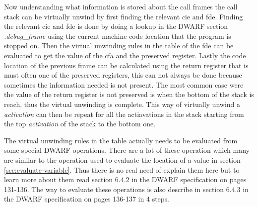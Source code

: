 Now understanding what information is stored about the call frames the call stack can be virtually unwind by first finding the relevant \gls{cie} and \gls{fde}.
Finding the relevant \gls{cie} and \gls{fde} is done by doing a lookup in the \gls{DWARF} section \emph{.debug\_frame} using the current machine code location that the program is stopped on.
Then the virtual unwinding rules in the table of the \gls{fde} can be evaluated to get the value of the \gls{cfa} and the preserved register.
Lastly the code location of the previous frame can be calculated using the return register that is must often one of the preserved registers, this can not always be done because sometimes the information needed is not present.
The most common case were the value of the return register is not preserved is when the bottom of the stack is reach, thus the virtual unwinding is complete.
This way of virtually unwind a \emph{activation} can then be repeat for all the actiavations in the stack starting from the top \emph{activation} of the stack to the bottom one.


The virtual unwinding rules in the table actually needs to be evaluated from some special \gls{DWARF} operations.
There are a lot of these operation which many are similar to the operation used to evaluate the location of a value in section \ref{sec:evaluate-variable}.
Thus there is no real need of explain them here but to learn more about them read section $6.4.2$ in the \gls{DWARF} specification \cite{dwarf} on pages 131-136.
The way to evaluate these operations is also describe in section $6.4.3$ in the \gls{DWARF} specification \cite{dwarf} on pages 136-137 in $4$ steps.

